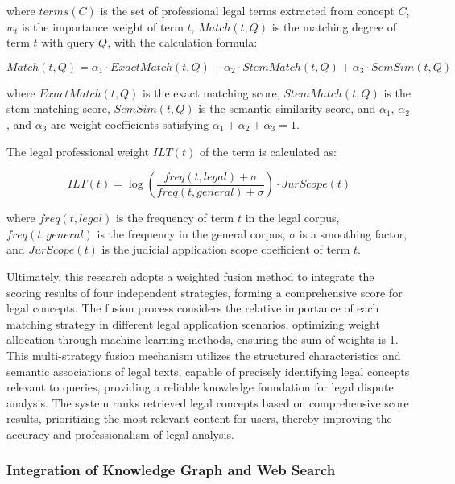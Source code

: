 \documentclass{article}
\theoremstyle{plain}
\theoremstyle{definition}
\begin{document}
where $terms(C)$ is the set of professional legal terms extracted from concept $C$, $w_t$ is the importance weight of term $t$, $Match(t, Q)$ is the matching degree of term $t$ with query $Q$, with the calculation formula:

\begin{equation}
Match(t, Q) = \alpha_1 \cdot ExactMatch(t, Q) + \alpha_2 \cdot StemMatch(t, Q) + \alpha_3 \cdot SemSim(t, Q)
\end{equation}

where $ExactMatch(t, Q)$ is the exact matching score, $StemMatch(t, Q)$ is the stem matching score, $SemSim(t, Q)$ is the semantic similarity score, and $\alpha_1$, $\alpha_2$, and $\alpha_3$ are weight coefficients satisfying $\alpha_1 + \alpha_2 + \alpha_3 = 1$.

The legal professional weight $ILT(t)$ of the term is calculated as:

\begin{equation}
ILT(t) = \log\left(\frac{freq(t, legal) + \sigma}{freq(t, general) + \sigma}\right) \cdot JurScope(t)
\end{equation}

where $freq(t, legal)$ is the frequency of term $t$ in the legal corpus, $freq(t, general)$ is the frequency in the general corpus, $\sigma$ is a smoothing factor, and $JurScope(t)$ is the judicial application scope coefficient of term $t$.

Ultimately, this research adopts a weighted fusion method to integrate the scoring results of four independent strategies, forming a comprehensive score for legal concepts. The fusion process considers the relative importance of each matching strategy in different legal application scenarios, optimizing weight allocation through machine learning methods, ensuring the sum of weights is 1. This multi-strategy fusion mechanism utilizes the structured characteristics and semantic associations of legal texts, capable of precisely identifying legal concepts relevant to queries, providing a reliable knowledge foundation for legal dispute analysis. The system ranks retrieved legal concepts based on comprehensive score results, prioritizing the most relevant content for users, thereby improving the accuracy and professionalism of legal analysis.

\subsubsection{Integration of Knowledge Graph and Web Search}
\label{sec3.2.3}
\end{document}
